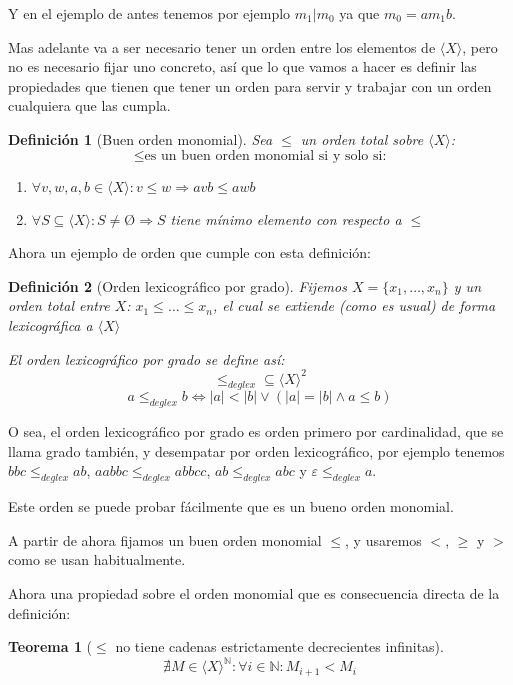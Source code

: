 \documentclass{amsbook} %
\theoremstyle{customstyle}
\newtheorem{definition}{Definición}[section]
\newtheorem{theorem}{Teorema}[section]
\begin{document}
Y en el ejemplo de antes tenemos por ejemplo $m_1 | m_0$ ya que $m_0 = a m_1 b$.

Mas adelante va a ser necesario tener un orden entre los elementos de $⟨X⟩$, pero no es necesario fijar uno concreto, así que lo que vamos a hacer es definir las propiedades que tienen que tener un orden para servir y trabajar con un orden cualquiera que las cumpla.

\begin{definition}[Buen orden monomial]
Sea $≤$ un orden total sobre $⟨X⟩$: %
\[ ≤ \text{es un buen orden monomial si y solo si:} \] %
\begin{enumerate}[label = (\alph*)]
\item $∀v, w, a, b ∈ ⟨X⟩ : v ≤ w ⇒ avb ≤ awb$

\item $∀S ⊆ ⟨X⟩ : S ≠ Ø ⇒ S$ tiene mínimo elemento con respecto a $≤$
\end{enumerate}
\end{definition}

Ahora un ejemplo de orden que cumple con esta definición:

\begin{definition}[Orden lexicográfico por grado]
Fijemos $X = \{x_1, …, x_n\}$ y un orden total entre $X$: $x_1 ≤ … ≤ x_n$, el cual se extiende (como es usual) de forma lexicográfica a $⟨X⟩$

El orden lexicográfico por grado se define así:
\[ ≤_{deglex} ⊆ ⟨X⟩^2 \] %
\[ a ≤_{deglex} b ⇔ |a| < |b| ∨ (|a| = |b| ∧ a ≤ b) \]
\end{definition}

O sea, el orden lexicográfico por grado es orden primero por cardinalidad, que se llama grado también, y desempatar por orden lexicográfico, por ejemplo tenemos $bbc ≤_{deglex} ab$, $aabbc ≤_{deglex} abbcc$, $ab ≤_{deglex} abc$ y $ε ≤_{deglex} a$.

Este orden se puede probar fácilmente que es un bueno orden monomial.

A partir de ahora fijamos un buen orden monomial $≤$, y usaremos $<$, $≥$ y $>$ como se usan habitualmente.

Ahora una propiedad sobre el orden monomial que es consecuencia directa de la definición:

\begin{theorem}[$≤$ no tiene cadenas estrictamente decrecientes infinitas]\label{thm:< no cadenas dec inf}
\[ ∄M ∈ ⟨X⟩^ℕ : ∀i ∈ ℕ : M_{i + 1} < M_i \] %
\end{theorem}
\end{document}
